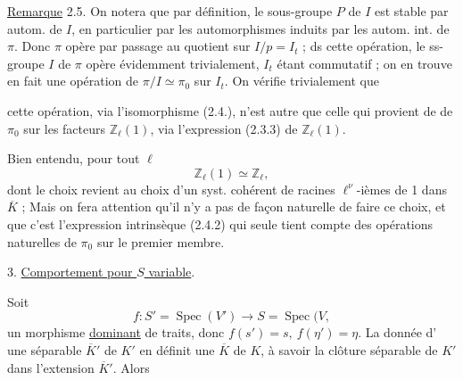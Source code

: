 \uline{Remarque} 2.5. On notera que par définition, le sous-groupe \(P\) de \(I\) est stable par \uline{} autom. de \(I\), en particulier par les automorphismes induits par les autom. int. de \(\pi\). Donc \(\pi\) opère par passage au quotient sur \(I/p=I_t\) ;   ds cette opération, le ss-groupe \(I\) de \(\pi\) opère évidemment trivialement, \(I_t\) étant commutatif ; on en trouve en fait une opération de \(\pi/I\simeq\pi_0\) sur \(I_t\).  On vérifie trivialement que

cette opération, via l'isomorphisme (2.4.),  n'est autre que celle qui provient de   de \(\pi_0\) sur les facteurs \(\mathbb Z_\ell(1)\), via l'expression (2.3.3) de \(\mathbb Z_\ell(1)\).

Bien entendu, pour tout \(\ell\)    
\[
\mathbb Z_\ell(1)\simeq\mathbb Z_\ell,
\]
dont le choix revient au choix d'un syst. cohérent de racines  \(\ell^\nu\)-ièmes de 1 dans \(\overline K\) ; Mais on fera attention qu'il n'y a pas de façon naturelle de faire ce choix, et que c'est l'expression intrinsèque (2.4.2) qui seule  tient compte des opérations naturelles de \(\pi_0\) sur le premier membre.

3. \uline{Comportement pour  \(S\) variable}.

Soit
\[
f:S'=\operatorname{Spec}(V')\longrightarrow S=\operatorname{Spec}(V,\tag*{(3.1)}
\]
un morphisme \uline{dominant} de traits,  donc \(f(s')=s,\ f(\eta')=\eta\). La donnée d' une   séparable  \(\overline K'\) de \(K'\) en définit une \(\overline K\) de \(K\), à savoir la clôture séparable de \(K'\) dans l'extension \(\overline K'\). Alors


